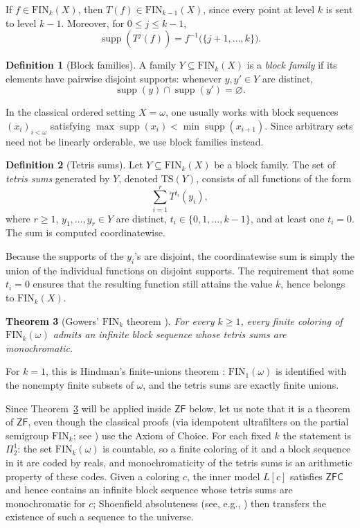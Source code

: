 \documentclass[10pt,a4paper]{amsart}
\newtheorem{theorem}{Theorem}[section]
\theoremstyle{definition}
\newtheorem{definition}[theorem]{Definition}
\DeclareMathOperator{\supp}{supp}
\newcommand{\ZF}{\mathsf{ZF}}
\newcommand{\ZFC}{\mathsf{ZFC}}
\newcommand{\FIN}{\mathrm{FIN}}
\newcommand{\TS}{\mathrm{TS}}
\begin{document}
If \(f\in\FIN_k(X)\), then \(T(f)\in\FIN_{k-1}(X)\), since every point at level \(k\) is sent to level \(k-1\).  Moreover, for \(0\leq j\leq k-1\),
\[
    \supp(T^j(f))=f^{-1}\bigl(\{j+1,\dots,k\}\bigr).
\]

\begin{definition}[Block families]
A family \(Y\subseteq \FIN_k(X)\) is a \emph{block family} if its elements have pairwise disjoint supports: whenever \(y,y'\in Y\) are distinct,
\[
    \supp(y)\cap \supp(y')=\varnothing.
\]
\end{definition}

In the classical ordered setting \(X=\omega\), one usually works with block sequences \((x_i)_{i<\omega}\) satisfying \(\max\supp(x_i)<\min\supp(x_{i+1})\).  Since arbitrary sets need not be linearly orderable, we use block families instead.

\begin{definition}[Tetris sums]
Let \(Y\subseteq \FIN_k(X)\) be a block family.  The set of \emph{tetris sums} generated by \(Y\), denoted \(\TS(Y)\), consists of all functions of the form
\[
    \sum_{i=1}^r T^{t_i}(y_i),
\]
where \(r\geq 1\), \(y_1,
\dots,y_r\in Y\) are distinct, \(t_i\in\{0,1,\dots,k-1\}\), and at least one \(t_i=0\).  The sum is computed coordinatewise.
\end{definition}

Because the supports of the \(y_i\)'s are disjoint, the coordinatewise sum is simply the union of the individual functions on disjoint supports.  The requirement that some \(t_i=0\) ensures that the resulting function still attains the value \(k\), hence belongs to \(\FIN_k(X)\).

\begin{theorem}[Gowers' \(\FIN_k\) theorem \cite{Gowers}]\label{thm:gowers}
For every \(k\geq 1\), every finite coloring of \(\FIN_k(\omega)\) admits an infinite block sequence whose tetris sums are monochromatic.
\end{theorem}

For \(k=1\), this is Hindman's finite-unions theorem \cite{Hindman}: \(\FIN_1(\omega)\) is identified with the nonempty finite subsets of \(\omega\), and the tetris sums are exactly finite unions.

Since Theorem~\ref{thm:gowers} will be applied inside \(\ZF\) below, let us note that it is a theorem of \(\ZF\), even though the classical proofs (via idempotent ultrafilters on the partial semigroup \(\FIN_k\); see \cite{Todorcevic}) use the Axiom of Choice.  For each fixed \(k\) the statement is \(\Pi^1_2\): the set \(\FIN_k(\omega)\) is countable, so a finite coloring of it and a block sequence in it are coded by reals, and monochromaticity of the tetris sums is an arithmetic property of these codes.  Given a coloring \(c\), the inner model \(L[c]\) satisfies \(\ZFC\) and hence contains an infinite block sequence whose tetris sums are monochromatic for \(c\); Shoenfield absoluteness (see, e.g., \cite[Chapter~25]{JechST}) then transfers the existence of such a sequence to the universe.
\end{document}
